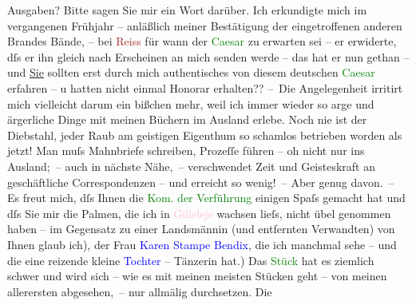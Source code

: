                Ausgaben? Bitte sagen Sie mir ein Wort darüber. Ich erkundigte mich im vergangenen
               Frühjahr – anläßlich meiner Bestätigung der eingetroffenen anderen Brandes Bände, –
                  \introOben{}bei \textcolor{brown}{Reiss}{}\ledrightnote{\textcolor{brown}{Erich Reiß}}\introOben{} für wann der \textcolor{green}{Caesar}{}\ledrightnote{\textcolor{green}{Gaius Julius Cæsar}} zu erwarten sei – er
               erwiderte, dſs er ihn gleich nach Erscheinen an mich senden werde – das hat er {\pb}nun gethan – und \uline{Sie} sollten erst durch mich authentisches von diesem deutschen \textcolor{green}{Caesar}{}\ledrightnote{\textcolor{green}{Gaius Julius Cæsar}} erfahren – u hatten nicht einmal Honorar
               erhalten??\pend
           \pstart
           – Die Angelegenheit irritirt mich vielleicht darum ein bißchen mehr, weil ich immer
               wieder so arge und ärgerliche Dinge mit meinen Büchern im Ausland erlebe. Noch nie
               ist der Diebstahl, jeder Raub am geistigen Eigenthum so schamlos betrieben worden als
               jetzt! Man muſs Mahnbriefe schreiben, Prozeſſe führen – oh nicht nur ins Ausland; –
               auch in nächste Nähe, – verschwendet Zeit und Geisteskraft an geschäftliche
               Correspondenzen – und erreicht so wenig! – Aber genug davon. –\pend
           \pstart
           Es freut mich, dſs Ihnen die \textcolor{green}{Kom. der Verführung}{}\ledrightnote{\textcolor{green}{Komödie der Verführung. In drei Akten}}
               einigen Spaſs gemacht hat und dſs Sie mir die Palmen, die ich in \textcolor{pink}{Gilleleje}{}\ledrightnote{\textcolor{pink}{Gilleleje}} wachsen {\pb}lieſs,
               nicht übel genommen haben – \label{T_L02423_1v}\label{T_L02423_1h}im
               Gegensatz zu einer Landsmännin (und entfernten Verwandten) von Ihnen glaub ich), der
               Frau \textcolor{blue}{Karen Stampe Bendix}{}\ledrightnote{\textcolor{blue}{Karen Stampe Bendix}}, die ich manchmal sehe –
               und die eine reizende kleine \textcolor{blue}{Tochter}{} – Tänzerin hat.) Das \textcolor{green}{Stück}{} hat es ziemlich schwer und wird sich – wie es mit meinen meisten
               Stücken geht – von meinen allerersten abgesehen, – nur allmälig durchsetzen. Die
